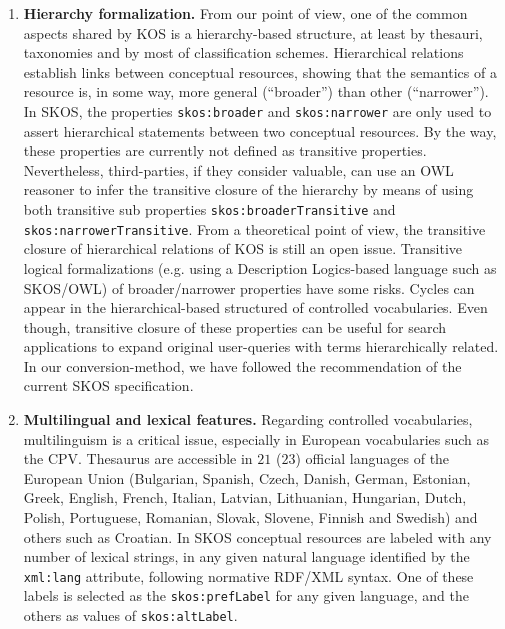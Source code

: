 \begin{enumerate}
 \item \textbf{Hierarchy formalization.} From our point of view, one of the common aspects shared by 
 KOS is a hierarchy-based structure, at least by thesauri, taxonomies and by most of 
 classification schemes. Hierarchical relations establish links between conceptual resources, 
 showing that the semantics of a resource is, in some way, more general (``broader'') than other (``narrower''). 
 In SKOS, the properties \texttt{skos:broader} and \texttt{skos:narrower} are only used to assert hierarchical 
 statements between two conceptual resources. By the way, these properties are currently not defined 
 as transitive properties. Nevertheless, third-parties, if they consider valuable, can use an OWL reasoner 
 to infer the transitive closure of the hierarchy by means of using both transitive sub properties 
 \texttt{skos:broaderTransitive} and \texttt{skos:narrowerTransitive}. From a theoretical point of view, the transitive closure of hierarchical relations 
 of KOS is still an open issue. Transitive logical formalizations (e.g. using a Description Logics-based language such as SKOS/OWL) 
 of broader/narrower properties have some risks. Cycles can appear in the hierarchical-based structured 
 of controlled vocabularies. Even though, transitive closure of these properties can be useful for 
 search applications to expand original user-queries with terms hierarchically related. In our conversion-method, 
 we have followed the recommendation of the current SKOS specification.
 
 \item \textbf{Multilingual and lexical features.} Regarding controlled vocabularies, 
 multilinguism is a critical issue, especially in European vocabularies such as the CPV. 
 Thesaurus are accessible in $21$ ($23$) official languages of the European Union 
 (Bulgarian, Spanish, Czech, Danish, German, Estonian, Greek, English, French, Italian, Latvian, Lithuanian, 
 Hungarian, Dutch, Polish, Portuguese, Romanian, Slovak, Slovene, Finnish and Swedish) and others such as Croatian. 
 In SKOS conceptual resources are labeled with any number of lexical strings, in any given natural 
 language identified by the \texttt{xml:lang} attribute, following normative RDF/XML syntax. 
 One of these labels is selected as the \texttt{skos:prefLabel} for any given language, and the 
 others as values of \texttt{skos:altLabel}.
 
\end{enumerate}
